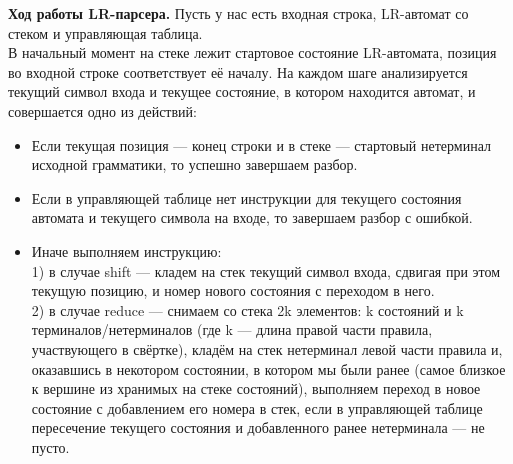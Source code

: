 \textbf{Ход работы LR-парсера.}
Пусть у нас есть входная строка, LR-автомат со стеком и управляющая таблица. \\
В начальный момент на стеке лежит стартовое состояние LR-автомата, позиция во входной строке соответствует её началу.
На каждом шаге анализируется текущий символ входа и текущее состояние, в котором находится автомат, и совершается одно из действий: 
\begin{itemize}
\item Если текущая позиция --- конец строки и в стеке --- стартовый нетерминал исходной грамматики, то успешно завершаем разбор.
\item Если в управляющей таблице нет инструкции для текущего состояния автомата и текущего символа на входе, то завершаем разбор с ошибкой.
\item Иначе выполняем инструкцию: \\
1) в случае shift --- кладем на стек текущий символ входа, сдвигая при этом текущую позицию, и номер нового состояния с переходом в него. \\
2) в случае reduce --- снимаем со стека 2k элементов: k состояний и k терминалов/нетерминалов (где k --- длина правой части правила, участвующего в свёртке), кладём на стек нетерминал левой части правила и, оказавшись в некотором состоянии, в котором мы были ранее (самое близкое к вершине из хранимых на стеке состояний), выполняем переход в новое состояние с добавлением его номера в стек, если в управляющей таблице пересечение текущего состояния и добавленного ранее нетерминала --- не пусто.
\end{itemize}

